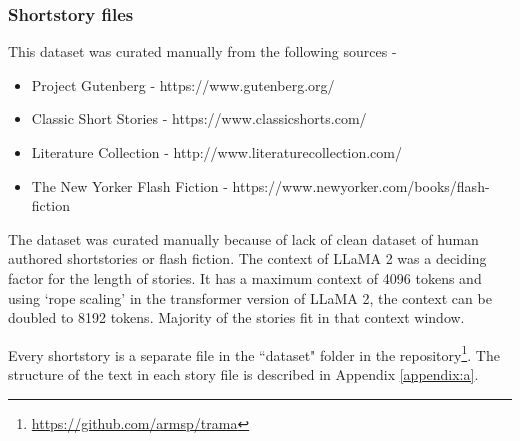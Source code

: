 \documentclass[11pt]{article}
\begin{document}
\subsubsection{Shortstory files}
This dataset was curated manually from the following sources - 
\begin{itemize}
  \item Project Gutenberg - https://www.gutenberg.org/
  \item Classic Short Stories - https://www.classicshorts.com/
  \item Literature Collection - http://www.literaturecollection.com/
  \item The New Yorker Flash Fiction - https://www.newyorker.com/books/flash-fiction
\end{itemize}
The dataset was curated manually because of lack of clean dataset of human authored shortstories or flash fiction. The context of LLaMA 2 was a deciding factor for the length of stories. It has a maximum context of 4096 tokens and using `rope scaling' in the transformer version of LLaMA 2, the context can be doubled to 8192 tokens. Majority of the stories fit in that context window.

Every shortstory is a separate file in the ``dataset" folder in the repository\footnote[2]{\url{https://github.com/armsp/trama}}. The structure of the text in each story file is described in Appendix \ref{appendix:a}.
\end{document}
